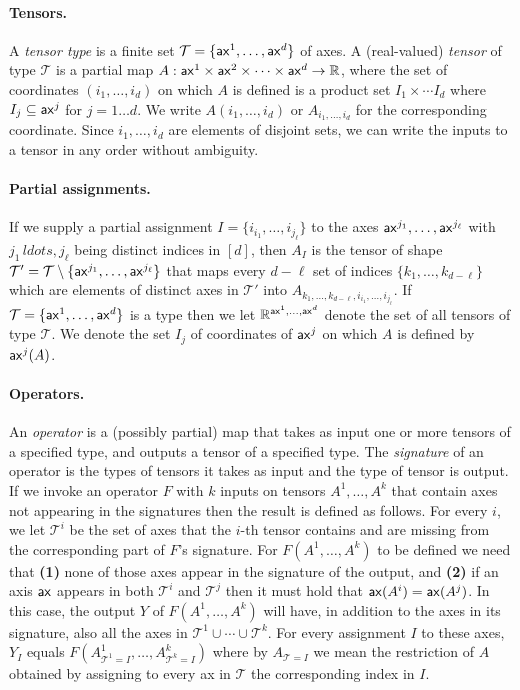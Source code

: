 \documentclass{article}
\begin{document}
\paragraph{Tensors.} A \emph{tensor type} is a finite set $\mathcal{T} = \{ \mathsf{ax}^1,\ldots, \mathsf{ax}^d \}$ of axes.
A  (real-valued) \emph{tensor} of type $\mathcal{T}$ is a partial map $A:\mathsf{ax}^1 \times \mathsf{ax}^2 \times \cdots \times \mathsf{ax}^d \rightarrow \mathbb{R}$,
where the set of coordinates $(i_1,\ldots,i_d)$ on which $A$ is defined is a product set $I_1 \times \cdots I_d$ where $I_j \subseteq \mathsf{ax}^j$ for $j=1 \ldots d$.
We write $A(i_1,\ldots,i_d)$ or $A_{i_1,\ldots,i_d}$ for the corresponding coordinate.
Since $i_1,\ldots,i_d$ are elements of disjoint sets, we can write the inputs to a tensor in any order without ambiguity.


\paragraph{Partial assignments.} If we supply a partial assignment $I = \{ i_{i_1},\ldots,i_{j_\ell} \}$ to the axes $\mathsf{ax}^{j_1},\ldots,\mathsf{ax}^{j_\ell}$ with $j_1\,ldots,j_\ell$ being distinct indices in  $[d]$, then $A_I$ is the tensor of shape $\mathcal{T}' = \mathcal{T} \setminus \{ \mathsf{ax}^{j_1},\ldots,\mathsf{ax}^{j_\ell} \}$ that maps every $d-\ell$ set of indices $\{ k_1,\ldots,k_{d-\ell} \}$ which are elements of distinct axes in $\mathcal{T}'$ into $A_{k_1,\ldots,k_{d-\ell}, i_{i_1},\ldots,i_{j_\ell}}$.
If $\mathcal{T} = \{ \mathsf{ax}^1,\ldots, \mathsf{ax}^d \}$ is a type then we let $\mathbb{R}^{\mathsf{ax}^1,\ldots, \mathsf{ax}^d }$ denote the set of all tensors of type $\mathcal{T}$.
We denote the set $I_j$ of coordinates of $\mathsf{ax}^j$ on which $A$ is defined by $\mathsf{ax}^j(A)$. 


\paragraph{Operators.} An \emph{operator}  is a (possibly partial) map that takes as input one or more tensors of a specified type, and outputs a tensor of a specified type.
The \emph{signature} of an operator is the types of tensors it takes as input and the type of tensor is output.
If we invoke an operator $F$ with $k$ inputs on tensors $A^1,\ldots,A^k$  that contain axes not appearing in the signatures then the result is defined as follows.
For every $i$, we let $\mathcal{T}^i$ be the set of axes that the $i$-th tensor contains and are missing from the corresponding part of  $F$'s signature.
For $F(A^1,\ldots,A^k)$ to be defined we need that \textbf{(1)} none of those axes appear in the signature of the output, and \textbf{(2)} if an axis $\mathsf{ax}$ appears in both $\mathcal{T}^i$ and $\mathcal{T}^j$ then it must hold that  $\mathsf{ax}(A^i)=\mathsf{ax}(A^j)$. 
In this case,   the output $Y$ of $F(A^1,\ldots,A^k)$ will have, in addition to the axes in its signature, also all the axes in $\mathcal{T}^1 \cup \cdots \cup \mathcal{T}^k$.
For every assignment $I$ to these axes, $Y_I$ equals $F(A^1_{\mathcal{T}^1=I},\ldots, A^k_{\mathcal{T}^k=I})$ where by $A_{\mathcal{T}=I}$ we mean the restriction of $A$ obtained by assigning to every ax in $\mathcal{T}$ the corresponding index in $I$. 
\end{document}

